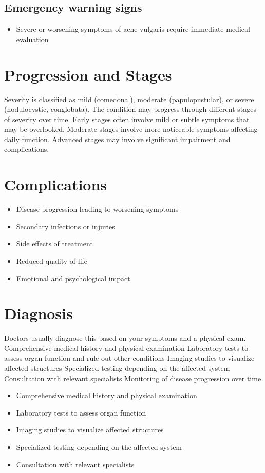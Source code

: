 \subsection{Emergency warning signs}
\begin{itemize}[noitemsep]
  \item Severe or worsening symptoms of acne vulgaris require immediate medical evaluation
\end{itemize}
\section{Progression and Stages}
Severity is classified as mild (comedonal), moderate (papulopustular), or severe (nodulocystic, conglobata). The condition may progress through different stages of severity over time. Early stages often involve mild or subtle symptoms that may be overlooked. Moderate stages involve more noticeable symptoms affecting daily function. Advanced stages may involve significant impairment and complications.
\section{Complications}
\begin{itemize}[noitemsep]
  \item Disease progression leading to worsening symptoms
  \item Secondary infections or injuries
  \item Side effects of treatment
  \item Reduced quality of life
  \item Emotional and psychological impact
\end{itemize}
\section{Diagnosis}
Doctors usually diagnose this based on your symptoms and a physical exam. Comprehensive medical history and physical examination Laboratory tests to assess organ function and rule out other conditions Imaging studies to visualize affected structures Specialized testing depending on the affected system Consultation with relevant specialists Monitoring of disease progression over time

\begin{itemize}[noitemsep]
  \item Comprehensive medical history and physical examination
  \item Laboratory tests to assess organ function
  \item Imaging studies to visualize affected structures
  \item Specialized testing depending on the affected system
  \item Consultation with relevant specialists
\end{itemize}
